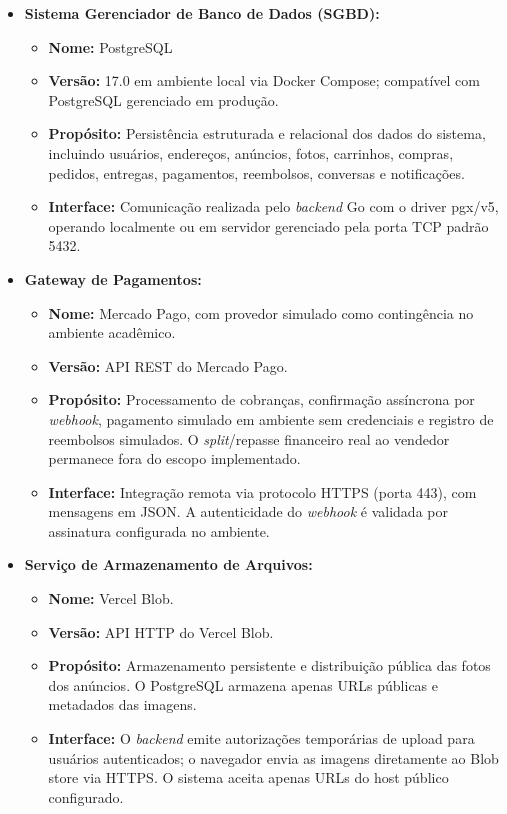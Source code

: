 ﻿\documentclass[12pt,a4paper]{article}
\begin{document}
\begin{itemize}
    \item \textbf{Sistema Gerenciador de Banco de Dados (SGBD):}
    \begin{itemize}
        \item[ ] \textbf{Nome:} PostgreSQL
        \item[ ] \textbf{Versão:} 17.0 em ambiente local via Docker Compose; compatível com PostgreSQL gerenciado em produção.
        \item[ ] \textbf{Propósito:} Persistência estruturada e relacional dos dados do sistema, incluindo usuários, endereços, anúncios, fotos, carrinhos, compras, pedidos, entregas, pagamentos, reembolsos, conversas e notificações.
        \item[ ] \textbf{Interface:} Comunicação realizada pelo \textit{backend} Go com o driver pgx/v5, operando localmente ou em servidor gerenciado pela porta TCP padrão 5432.
    \end{itemize}
    
    \vspace{0.5em}
    
    \item \textbf{Gateway de Pagamentos:}
    \begin{itemize}
        \item[ ] \textbf{Nome:} Mercado Pago, com provedor simulado como contingência no ambiente acadêmico.
        \item[ ] \textbf{Versão:} API REST do Mercado Pago.
        \item[ ] \textbf{Propósito:} Processamento de cobranças, confirmação assíncrona por \textit{webhook}, pagamento simulado em ambiente sem credenciais e registro de reembolsos simulados. O \textit{split}/repasse financeiro real ao vendedor permanece fora do escopo implementado.
        \item[ ] \textbf{Interface:} Integração remota via protocolo HTTPS (porta 443), com mensagens em JSON. A autenticidade do \textit{webhook} é validada por assinatura configurada no ambiente.
    \end{itemize}
    
    \vspace{0.5em}

    \item \textbf{Serviço de Armazenamento de Arquivos:}
    \begin{itemize}
        \item[ ] \textbf{Nome:} Vercel Blob.
        \item[ ] \textbf{Versão:} API HTTP do Vercel Blob.
        \item[ ] \textbf{Propósito:} Armazenamento persistente e distribuição pública das fotos dos anúncios. O PostgreSQL armazena apenas URLs públicas e metadados das imagens.
        \item[ ] \textbf{Interface:} O \textit{backend} emite autorizações temporárias de upload para usuários autenticados; o navegador envia as imagens diretamente ao Blob store via HTTPS. O sistema aceita apenas URLs do host público configurado.
    \end{itemize}


\end{itemize}
\end{document}
